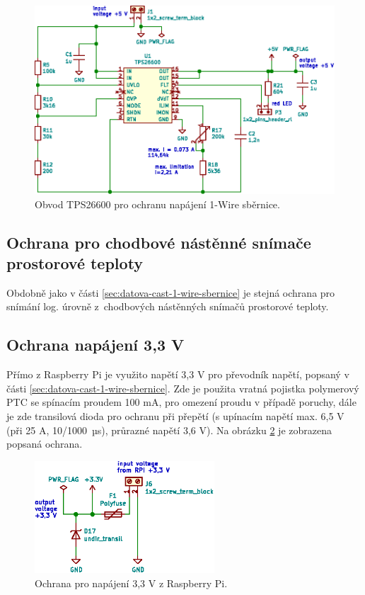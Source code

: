 \begin{figure}[H]
    \centering
    \includegraphics[width=\textwidth]{images/svg/kicad/ochrana-napajeni-1-wire.eps}
    \caption[Obvod TPS26600 pro ochranu napájení 1-Wire sběrnice.]{Obvod TPS26600 pro ochranu napájení 1-Wire sběrnice.}
    \label{fig:ochrana-napajeni-1-wire}
\end{figure}

\subsection{Ochrana pro chodbové nástěnné snímače prostorové teploty}
Obdobně jako v části \ref{sec:datova-cast-1-wire-sbernice} je stejná ochrana pro snímání log. úrovně z~chodbových nástěnných snímačů prostorové teploty.

\subsection{Ochrana napájení 3,3 V}
Přímo z Raspberry Pi je využito napětí 3,3 V pro převodník napětí, popsaný v části \ref{sec:datova-cast-1-wire-sbernice}. Zde je použita vratná pojistka polymerový PTC se spínacím proudem 100 mA, pro omezení proudu v případě poruchy, dále je zde transilová dioda pro ochranu při přepětí (s upínacím napětí max. 6,5 V (při 25 A, 10/1000~µs), průrazné napětí 3,6 V). Na obrázku \ref{fig:ochrana-napajeni-3_3-v} je zobrazena popsaná ochrana.

\begin{figure}[H]
    \centering
    \includegraphics[width=0.6\textwidth]{images/svg/kicad/ochrana-napajeni-3_3-v.eps}
    \caption[Ochrana pro napájení 3,3 V z Raspberry Pi.]{Ochrana pro napájení 3,3 V z Raspberry Pi.}
    \label{fig:ochrana-napajeni-3_3-v}
\end{figure}


